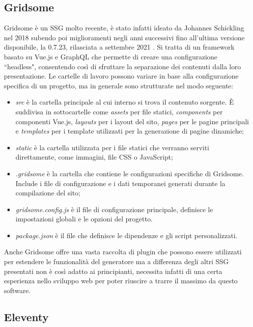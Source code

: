 \documentclass[target=bach,aauheader=]{thud}
\begin{document}
\subsection{Gridsome}
Gridsome è un SSG molto recente, è stato infatti ideato da Johannes Schickling nel 2018 subendo poi miglioramenti negli anni successivi fino all'ultima versione disponibile, la 0.7.23, rilasciata a settembre 2021 \cite{gridsome-site}.
Si tratta di un framework basato su Vue.js e GraphQL che permette di creare una configurazione ``headless", consentendo così di sfruttare la separazione dei contenuti dalla loro presentazione.
Le cartelle di lavoro possono variare in base alla configurazione specifica di un progetto, ma in generale sono strutturate nel modo seguente:

\begin{itemize}
    \item \textit{src} è la cartella principale al cui interno si trova il contenuto sorgente. È suddivisa in sottocartelle come \textit{assets} per file statici, \textit{components} per componenti Vue.js, \textit{layouts} per i layout del sito, \textit{pages} per le pagine principali e \textit{templates} per i template utilizzati per la generazione di pagine dinamiche;
    \item \textit{static} è la cartella utilizzata per i file statici che verranno serviti direttamente, come immagini, file CSS o JavaScript;
    \item \textit{.gridsome} è la cartella che contiene le configurazioni specifiche di Gridsome. Include i file di configurazione e i dati temporanei generati durante la compilazione del sito;
    \item \textit{gridsome.config.js} è il file di configurazione principale, definisce le impostazioni globali e le opzioni del progetto.
    \item \textit{package.json} è il file che definisce le dipendenze e gli script personalizzati.
\end{itemize}
Anche Gridsome offre una vasta raccolta di plugin che possono essere utilizzati per estendere le funzionalità del generatore ma a differenza degli altri SSG presentati non è così adatto ai principianti, necessita infatti di una certa esperienza nello sviluppo web per poter riuscire a trarre il massimo da questo software.

\subsection{Eleventy}
\end{document}
